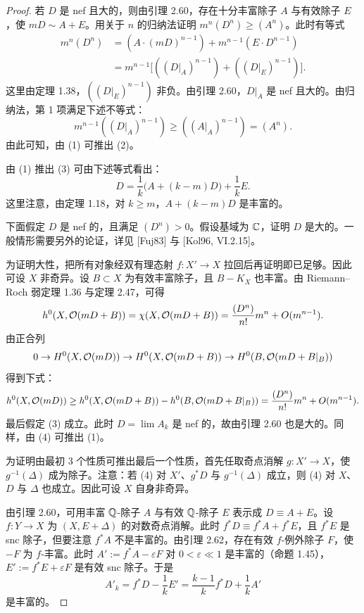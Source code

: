 
\begin{proof}
若 $D$ 是 nef 且大的，则由引理 2.60，存在十分丰富除子 $A$ 与有效除子 $E$，使 $mD\sim A+E$。用关于 $n$ 的归纳法证明 $m^n(D^n)\ge(A^n)$。此时有等式
\[
\begin{aligned}
m^n(D^n)&=(A\cdot(mD)^{n-1})+m^{n-1}(E\cdot D^{n-1})\\
&=m^{n-1}\bigl[((D|_A)^{n-1})+((D|_E)^{n-1})\bigr].
\end{aligned}
\]
这里由定理 1.38，$((D|_E)^{n-1})$ 非负。由引理 2.60，$D|_A$ 是 nef 且大的。由归纳法，第 1 项满足下述不等式：
\[
m^{n-1}((D|_A)^{n-1})\ge((A|_A)^{n-1})=(A^n).
\]
由此可知，由 (1) 可推出 (2)。

由 (1) 推出 (3) 可由下述等式看出：
\[
D=\frac1k\bigl(A+(k-m)D\bigr)+\frac1kE.
\]
这里注意，由定理 1.18，对 $k\ge m$，$A+(k-m)D$ 是丰富的。

下面假定 $D$ 是 nef 的，且满足 $(D^n)>0$。假设基域为 $\mathbb{C}$，证明 $D$ 是大的。一般情形需要另外的论证，详见 [Fuj83] 与 [Kol96, VI.2.15]。

为证明大性，把所有对象经双有理态射 $f:X'\to X$ 拉回后再证明即已足够。因此可设 $X$ 非奇异。设 $B\subset X$ 为有效丰富除子，且 $B-K_X$ 也丰富。由 Riemann–Roch 弱定理 1.36 与定理 2.47，可得
\[
h^0(X,\mathcal{O}(mD+B))=\chi(X,\mathcal{O}(mD+B))=\frac{(D^n)}{n!}m^n+O(m^{n-1}).
\]
由正合列
\[
0\to H^0(X,\mathcal{O}(mD))\to H^0(X,\mathcal{O}(mD+B))\to H^0(B,\mathcal{O}(mD+B|_B))
\]
得到下式：
\[
h^0(X,\mathcal{O}(mD))\ge h^0(X,\mathcal{O}(mD+B))-h^0(B,\mathcal{O}(mD+B|_B))
=\frac{(D^n)}{n!}m^n+O(m^{n-1}).
\]
最后假定 (3) 成立。此时 $D=\lim A_k$ 是 nef 的，故由引理 2.60 也是大的。同样，由 (4) 可推出 (1)。

为证明由最初 3 个性质可推出最后一个性质，首先任取奇点消解 $g:X'\to X$，使 $g^{-1}(\Delta)$ 成为除子。注意：若 (4) 对 $X'$、$g^*D$ 与 $g^{-1}(\Delta)$ 成立，则 (4) 对 $X$、$D$ 与 $\Delta$ 也成立。因此可设 $X$ 自身非奇异。

由引理 2.60，可用丰富 $\mathbb{Q}$-除子 $A$ 与有效 $\mathbb{Q}$-除子 $E$ 表示成 $D\equiv A+E$。设 $f:Y\to X$ 为 $(X,E+\Delta)$ 的对数奇点消解。此时 $f^*D\equiv f^*A+f^*E$，且 $f^*E$ 是 snc 除子，但要注意 $f^*A$ 不是丰富的。由引理 2.62，存在有效 $f$-例外除子 $F$，使 $-F$ 为 $f$-丰富。此时 $A':=f^*A-\varepsilon F$ 对 $0<\varepsilon\ll 1$ 是丰富的（命题 1.45），$E':=f^*E+\varepsilon F$ 是有效 snc 除子。于是
\[
A'_k=f^*D-\frac1kE'=\frac{k-1}{k}f^*D+\frac1kA'
\]
是丰富的。
\end{proof}


